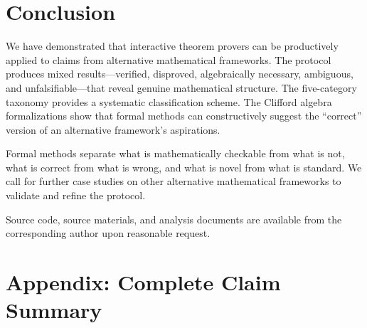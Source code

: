 \documentclass[runningheads]{llncs}
\begin{document}
\section{Conclusion}
\label{sec:conclusion}

We have demonstrated that interactive theorem provers can be productively
applied to claims from alternative mathematical frameworks. The protocol
produces mixed results---verified, disproved, algebraically necessary,
ambiguous, and unfalsifiable---that reveal genuine mathematical structure.
The five-category taxonomy provides a systematic classification scheme.
The Clifford algebra formalizations show that formal methods can constructively
suggest the ``correct'' version of an alternative framework's aspirations.

Formal methods separate what is mathematically checkable from what is not,
what is correct from what is wrong, and what is novel from what is standard.
We call for further case studies on other alternative mathematical frameworks
to validate and refine the protocol.

Source code, source materials, and analysis documents are available from
the corresponding author upon reasonable request.

\section*{Appendix: Complete Claim Summary}
\label{sec:appendix}
\end{document}
